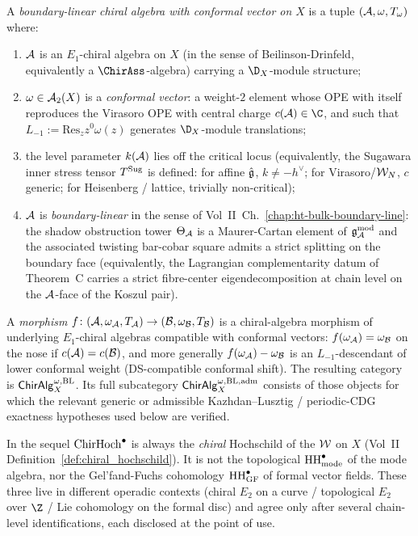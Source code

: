 \begin{definition}
\label{def:uhf-chiralg-omega-bl}
A \emph{boundary-linear chiral algebra with conformal vector on
$X$} is a tuple $(\mathcal{A}, \omega, T_\omega)$ where:
\begin{enumerate}[label=\textup{(\roman*)}]
\item $\mathcal{A}$ is an $E_1$-chiral algebra on $X$ (in the sense of
 Beilinson-Drinfeld, equivalently a $\ChirAss$-algebra) carrying a
 $\D_X$-module structure;
\item $\omega \in \mathcal{A}_2(X)$ is a \emph{conformal vector}: a
 weight-$2$ element whose OPE with itself reproduces the Virasoro
 OPE with central charge $c(\cA) \in \C$, and such that
 $L_{-1} := \mathrm{Res}_z z^0 \omega(z)$ generates $\D_X$-module
 translations;
\item the level parameter $k(\mathcal{A})$ lies off the critical locus
 (equivalently, the Sugawara inner stress tensor $T^{\mathrm{Sug}}$ is
 defined: for affine $\hat{\mathfrak{g}}$, $k \neq -h^\vee$; for
 Virasoro/$\mathcal{W}_N$, $c$ generic; for Heisenberg / lattice, trivially
 non-critical);
\item $\mathcal{A}$ is \emph{boundary-linear} in the sense of
 Vol~II~Ch.~\ref*{chap:ht-bulk-boundary-line}: the shadow obstruction
 tower $\Theta_{\mathcal{A}}$ is a Maurer-Cartan element of
 $\mathfrak{g}^{\mathrm{mod}}_{\mathcal{A}}$ \textup{and} the associated
 twisting bar-cobar square admits a strict splitting on the
 boundary face (equivalently, the Lagrangian complementarity
 datum of Theorem~C carries a strict fibre-center eigendecomposition
 at chain level on the $\mathcal{A}$-face of the Koszul pair).
\end{enumerate}
A \emph{morphism} $f \colon (\mathcal{A}, \omega_{\mathcal{A}}, T_{\mathcal{A}}) \to
(\mathcal{B}, \omega_{\mathcal{B}}, T_{\mathcal{B}})$ is a chiral-algebra morphism of
underlying $E_1$-chiral algebras compatible with conformal vectors:
$f(\omega_{\mathcal{A}}) = \omega_{\mathcal{B}}$ on the nose if $c(\mathcal{A}) = c(\mathcal{B})$, and
more generally $f(\omega_{\mathcal{A}}) - \omega_{\mathcal{B}}$ is an
$L_{-1}$-descendant of lower conformal weight
(DS-compatible conformal shift). The resulting category is
$\mathsf{ChirAlg}^{\omega,\mathrm{BL}}_X$. Its full subcategory
$\mathsf{ChirAlg}^{\omega,\mathrm{BL,adm}}_X$ consists of those objects for
which the relevant generic or admissible Kazhdan--Lusztig / periodic-CDG
exactness hypotheses used below are verified.
\end{definition}

\begin{remark}
\label{rem:uhf-three-hochschilds}
In the sequel $\mathrm{ChirHoch}^\bullet$ is always the \emph{chiral}
Hochschild of the $\mathcal{W}$ on $X$
(Vol~II Definition~\ref*{def:chiral_hochschild}). It is not the
topological $\mathrm{HH}^\bullet_{\mathrm{mode}}$ of the mode algebra, nor
the Gel'fand-Fuchs cohomology $\mathrm{HH}^\bullet_{\mathrm{GF}}$ of
formal vector fields. These three live in different operadic
contexts (chiral $E_2$ on a curve / topological $E_2$ over $\Z$ /
Lie cohomology on the formal disc) and agree only after several
chain-level identifications, each disclosed at the point of use.
\end{remark}

